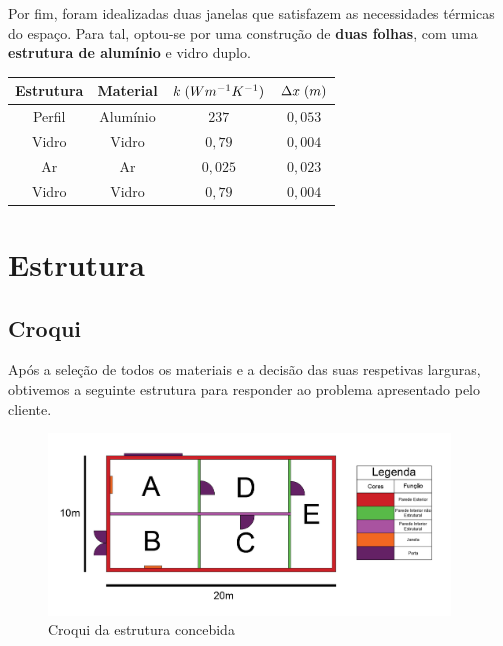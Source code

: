 \documentclass[12pt, a4paper]{article}
\begin{document}
Por fim, foram idealizadas duas janelas que satisfazem as necessidades térmicas do espaço.
Para tal, optou-se por uma construção de \textbf{duas folhas}, com uma \textbf{estrutura de alumínio} e
vidro duplo.
\begin{center}
	\begin{tabular}{||c c c c||}
		\hline
		Estrutura & Material & $k \hspace{1mm} (Wm^{-1}K^{-1})$ & $\Delta x \hspace{1mm} (m)$ \\ [0.5ex]
		\hline\hline
		Perfil    & Alumínio & $237$                            & $0,053$                     \\
		\hline
		Vidro     & Vidro    & $0,79$                           & $0,004$                     \\
		\hline
		Ar        & Ar       & $0,025$                          & $0,023$                     \\
		\hline
		Vidro     & Vidro    & $0,79$                           & $0,004$                     \\
		\hline
	\end{tabular}
\end{center}






\section{Estrutura}\label{sec:Estrutura}


\subsection{Croqui}\label{sub:croqui}

Ap\'os a sele\c{c}\~ao de todos os materiais e a decis\~ao das suas respetivas larguras,
obtivemos a seguinte estrutura para responder ao problema apresentado pelo cliente.

\begin{figure}[htpb]
    \begin{center}
        \includegraphics[width=0.95\textwidth]{img/sketch4.png}
    \end{center}
    \caption{Croqui da estrutura concebida}\label{fig:croqui}
\end{figure}
\end{document}
